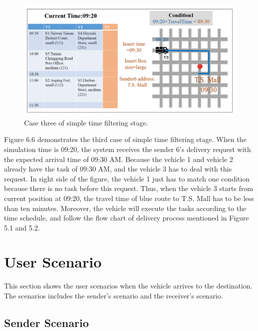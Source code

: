 \documentclass[12pt]{ksthesis}
\begin{document}
\begin{thesis}
{\begin{figure}[t]
\centering
\includegraphics[width=1.0\textwidth]{./Thesis_figures/F6-6_caseThree_SchedulingStage.PNG}
\caption{\large Case three of simple time filtering stage.}
\vspace{0.5cm}
\label{Fig:CaseThree_TimeFiltering}
\end{figure}

Figure 6.6 demonstrates the third case of simple time filtering stage. When the simulation time is 09:20, the system receives the sender 6’s delivery request with the expected arrival time of 09:30 AM. Because the vehicle 1 and vehicle 2 already have the task of 09:30 AM, and the vehicle 3 has to deal with this request. In right side of the figure, the vehicle 1 just has to match one condition because there is no task before this request. Thus, when the vehicle 3 starts from current position at 09:20, the travel time of blue route to T.S. Mall has to be less than ten minutes.
Moreover, the vehicle will execute the tasks according to the time schedule, and follow the flow chart of delivery process mentioned in Figure 5.1 and 5.2.


\section{User Scenario}

This section shows the user scenarios when the vehicle arrives to the destination. The scenarios includes the sender's scenario and the receiver's scenario.

\subsection{Sender Scenario}

}
\end{thesis}
\end{document}
